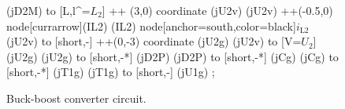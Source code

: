 \begin{figure}[htb]
\begin{center}
\begin{circuitikz}
                    (jD2M) to  [L,l^=$L_2$] ++ (3,0) coordinate (jU2v)
                    (jU2v) ++(-0.5,0) node[currarrow](IL2){}
                    (IL2)  node[anchor=south,color=black]{$i_\mathrm{L2}$}
                    (jU2v) to [short,-] ++(0,-3) coordinate (jU2g)
                    (jU2v) to [V=$U_2$] (jU2g)
                    (jU2g) to [short,-*] (jD2P)
                    (jD2P) to [short,-*] (jCg)                    
                    (jCg) to [short,-*] (jT1g)                    
                    (jT1g) to [short,-] (jU1g)                    
           ;
        \end{circuitikz}
    \end{center}
    \caption{Buck-boost converter circuit.}
    \label{fig:ex02_step_down_with_load_resistor}
\end{figure}
